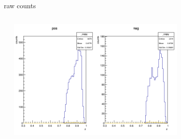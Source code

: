 \begin{frame}{raw counts}
\begin{columns}
\begin{column}[T]{0.5\textwidth}
\end{column}
\begin{column}[T]{0.5\textwidth}
\includegraphics[width = 0.7\textwidth]{results/yield/statistics/counts_x_Q2_z_0.60_5.500_0.90.png}
\end{column}
\end{columns}
\end{frame}
